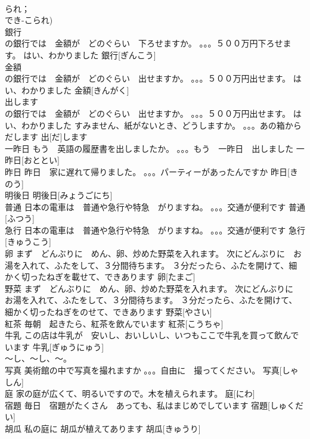 \documentclass[8pt]{extreport}
\begin{document}
\begin{CJK}{UTF8}{min}
\\	られ；
\\	でき-こられ)
\\	銀行	
\\	の銀行では　金額が　どのぐらい　下ろせますか。 。。。５００万円下ろせます。 はい、わかりました	銀行[ぎんこう]			
\\	金額	
\\	の銀行では　金額が　どのぐらい　出せますか。 。。。５００万円出せます。 はい、わかりました	金額[きんがく]			
\\	出します	
\\	の銀行では　金額が　どのぐらい　出せますか。 。。。５００万円出せます。 はい、わかりました すみません、紙がないとき、どうしますか。 。。。あの箱から　だします	出[だ]します			
\\	一昨日	もう　英語の履歴書を出しましたか。 。。。もう　一昨日　出しました	一昨日[おととい]			
\\	昨日	昨日　家に遅れて帰りました。 。。。パーティーがあったんですか	昨日[きのう]			
\\	明後日		明後日[みょうごにち]					
\\	普通	日本の電車は　普通や急行や特急　がりますね。 。。。交通が便利です	普通[ふつう]			
\\	急行	日本の電車は　普通や急行や特急　がりますね。 。。。交通が便利です	急行[きゅうこう]			
\\	卵	まず　どんぶりに　めん、卵、炒めた野菜を入れます。 次にどんぶりに　お湯を入れて、ふたをして、３分間待ちます。 ３分だったら、ふたを開けて、細かく切ったねぎを載せて、できあります	卵[たまご]			
\\	野菜	まず　どんぶりに　めん、卵、炒めた野菜を入れます。 次にどんぶりに　お湯を入れて、ふたをして、３分間待ちます。 ３分だったら、ふたを開けて、細かく切ったねぎをのせて、できあります	野菜[やさい]			
\\	紅茶	毎朝　起きたら、紅茶を飲んでいます	紅茶[こうちゃ]			
\\	牛乳	この店は牛乳が　安いし、おいしいし、いつもここで牛乳を買って飲んでいます	牛乳[ぎゅうにゅう]			
\\	～し、～し、～。 
\\	写真	美術館の中で写真を撮れますか 。。。自由に　撮ってください。	写真[しゃしん]			
\\	庭	家の庭が広くて、明るいですので。木を植えられます。	庭[にわ]			
\\	宿題	毎日　宿題がたくさん　あっても、私はまじめでしています	宿題[しゅくだい]			
\\	胡瓜	私の庭に 胡瓜が植えてあります	胡瓜[きゅうり]			

\end{CJK}
\end{document}
